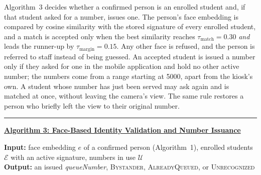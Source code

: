 \documentclass{research}
\begin{document}
Algorithm~3 decides whether a confirmed person is an enrolled student
and, if that student asked for a number, issues one. The person's face
embedding is compared by cosine similarity with the stored signature of
every enrolled student, and a match is accepted only when the best
similarity reaches $\tau_{\mathrm{match}} = 0.30$ \emph{and} leads the
runner-up by $\tau_{\mathrm{margin}} = 0.15$. Any other face is refused,
and the person is referred to staff instead of being guessed. An
accepted student is issued a number only if they asked for one in the
mobile application and hold no other active number; the numbers come
from a range starting at 5000, apart from the kiosk's own. A student
whose number has just been served may ask again and is matched at once,
without leaving the camera's view. The same rule restores a person who
briefly left the view to their original number.

\vspace{0.5em}
\noindent\rule{\linewidth}{0.8pt}

\noindent\textbf{\underline{Algorithm 3: Face-Based Identity Validation
and Number Issuance}}

\noindent\textbf{Input:} face embedding $e$ of a confirmed person
(Algorithm~1), enrolled students $\mathcal{E}$ with an active
signature, numbers in use $\mathcal{U}$\\
\noindent\textbf{Output:} an issued \textit{queueNumber},
\textsc{Bystander}, \textsc{AlreadyQueued}, or \textsc{Unrecognized}
\end{document}
